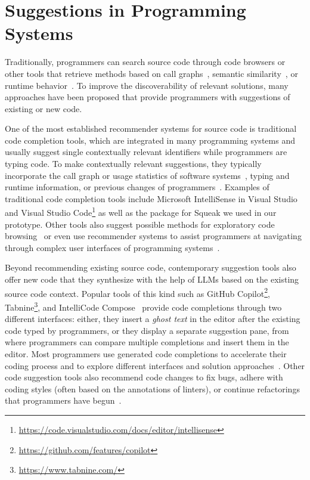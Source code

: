 
\section{Suggestions in Programming Systems}
\label{sec:related_work/suggestions}

Traditionally, programmers can search source code through code browsers or other tools that retrieve methods based on call graphs~\cites[chap.~10]{goldberg1984smalltalk}[sec.~6.2]{kraemer2010stacksplorer}{thiede2023squeak}, semantic similarity~\cite{husain2020codesearchnet}, or runtime behavior~\cite[sec.~1.8]{thiede2023squeak}.
To improve the discoverability of relevant solutions, many approaches have been proposed that provide programmers with suggestions of existing or new code.

One of the most established recommender systems for source code is traditional code completion tools, which are integrated in many programming systems and usually suggest single contextually relevant identifiers while programmers are typing code.
To make contextually relevant suggestions, they typically incorporate the call graph or usage statistics of software systems~\cite{thiede2022augmenting}, typing and runtime information, or previous changes of programmers~\cite{robbes2008program}.
Examples of traditional code completion tools include Microsoft IntelliSense in Visual Studio and Visual Studio Code\footnote{\url{https://code.visualstudio.com/docs/editor/intellisense}} as well as the  package for Squeak we used in our prototype.
Other tools also suggest possible methods for exploratory code browsing~\cite{robillard2005automatic,bruch2006fruit} or even use recommender systems to assist programmers at navigating through complex user interfaces of programming systems~\cite{murphy2012improving}.

Beyond recommending existing source code, contemporary suggestion tools also offer new code that they synthesize with the help of LLMs based on the existing source code context.
Popular tools of this kind such as GitHub Copilot\footnote{\url{https://github.com/features/copilot}}, Tabnine\footnote{\url{https://www.tabnine.com/}}, and IntelliCode Compose~\cite{svyatkovskiy2020intellicode} provide code completions through two different interfaces:
either, they insert a \emph{ghost text} in the editor after the existing code typed by programmers, or they display a separate suggestion pane, from where programmers can compare multiple completions and insert them in the editor.
Most programmers use generated code completions to accelerate their coding process and to explore different interfaces and solution approaches~\cite{barka2023grounded}.
Other code suggestion tools also recommend code changes to fix bugs, adhere with coding styles (often based on the annotations of linters), or continue refactorings that programmers have begun~\cite{vaithilingam2023towards}.
